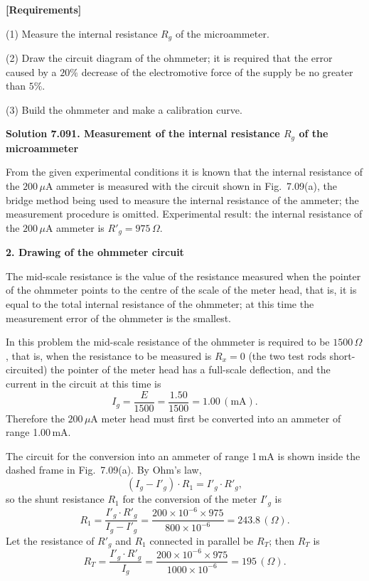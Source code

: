 \textbf{[Requirements]}

(1) Measure the internal resistance $R_g$ of the microammeter.

(2) Draw the circuit diagram of the ohmmeter; it is required that the error caused by a $20\%$ decrease of the electromotive force of the supply be no greater than $5\%$.

(3) Build the ohmmeter and make a calibration curve.

\textbf{Solution 7.09}\quad \textbf{1. Measurement of the internal resistance $R_g$ of the microammeter}

From the given experimental conditions it is known that the internal resistance of the $200\,\mu$A ammeter is measured with the circuit shown in Fig.~7.09(a), the bridge method being used to measure the internal resistance of the ammeter; the measurement procedure is omitted. Experimental result: the internal resistance of the $200\,\mu$A ammeter is $R'_g=975\,\Omega$.

\textbf{2. Drawing of the ohmmeter circuit}

The mid-scale resistance is the value of the resistance measured when the pointer of the ohmmeter points to the centre of the scale of the meter head, that is, it is equal to the total internal resistance of the ohmmeter; at this time the measurement error of the ohmmeter is the smallest.

In this problem the mid-scale resistance of the ohmmeter is required to be $1500\,\Omega$, that is, when the resistance to be measured is $R_x=0$ (the two test rods short-circuited) the pointer of the meter head has a full-scale deflection, and the current in the circuit at this time is
\[
I_g=\frac{E}{1500}=\frac{1.50}{1500}=1.00\,(\mathrm{mA}).
\]
Therefore the $200\,\mu$A meter head must first be converted into an ammeter of range 1.00\,mA.

The circuit for the conversion into an ammeter of range 1\,mA is shown inside the dashed frame in Fig.~7.09(a). By Ohm's law,
\[
(I_g-I'_g)\cdot R_1=I'_g\cdot R'_g,
\]
so the shunt resistance $R_1$ for the conversion of the meter $I'_g$ is
\[
R_1=\frac{I'_g\cdot R'_g}{I_g-I'_g}=\frac{200\times10^{-6}\times975}{800\times10^{-6}}=243.8\,(\Omega).
\]
Let the resistance of $R'_g$ and $R_1$ connected in parallel be $R_T$; then $R_T$ is
\[
R_T=\frac{I'_g\cdot R'_g}{I_g}=\frac{200\times10^{-6}\times975}{1000\times10^{-6}}=195\,(\Omega).
\]

